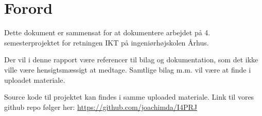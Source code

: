 \chapter{Forord}


Dette dokument er sammensat for at dokumentere arbejdet på 4. semesterprojektet for retningen IKT på ingeniørhøjskolen Århus.

Der vil i denne rapport være referencer til bilag og dokumentation, som det ikke ville være hensigtsmæssigt at medtage. Samtlige bilag m.m. vil være at finde i uploadet materiale. 

Source kode til projektet kan findes i samme uploaded materiale. Link til vores github repo følger her: \newline \url{https://github.com/joachimda/I4PRJ}

